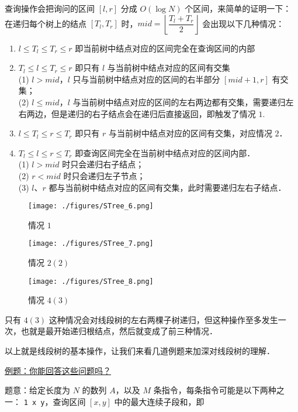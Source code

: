 查询操作会把询问的区间 $[l, r]$ 分成 $O(\log N)$ 个区间，来简单的证明一下：
在递归每个树上的结点 $[T_l, T_r]$ 时，$mid = \left\lfloor\dfrac{T_l+T_r}{2}\right\rfloor$ 会出现以下几种情况：

\begin{enumerate}
\item $l \leq T_l \leq T_r \leq r$ 即当前树中结点对应的区间完全在查询区间的内部
\item $T_l \leq l \leq T_r \leq r$ 即只有 $l$ 与当前树中结点对应的区间有交集\\
      (1) $l > mid$，$l$ 只与当前树中结点对应的区间的右半部分 $[mid + 1, r]$ 有交集； \\
      (2) $l \leq mid$，$l$ 与当前树中结点对应的区间的左右两边都有交集，需要递归左右两边，但是递归的右子结点会在递归后直接返回，即触发了情况 $1$.\\
\item $l \leq T_l \leq r \leq T_r$ 即只有 $r$ 与当前树中结点对应的区间有交集，对应情况 $2$．
\item $T_l \leq l \leq r \leq T_r$ 即查询区间完全在当前树中结点对应的区间内部．\\
      (1) $l > mid$ 时只会递归右子结点； \\
      (2) $r < mid$ 时只会递归左子节点； \\
      (3) $l$、$r$ 都与当前树中结点对应的区间有交集，此时需要递归左右子结点． \\

\end{enumerate}

\begin{figure}[ht]
\centering
\texttt{[image: ./figures/STree\_6.png]}
\caption{情况 $1$} \label{STree_fig6}
\end{figure}

\begin{figure}[ht]
\centering
\texttt{[image: ./figures/STree\_7.png]}
\caption{情况 $2(2)$} \label{STree_fig7}
\end{figure}

\begin{figure}[ht]
\centering
\texttt{[image: ./figures/STree\_8.png]}
\caption{情况 $4(3)$} \label{STree_fig8}
\end{figure}



只有 $4(3)$ 这种情况会对线段树的左右两棵子树递归，但这种操作至多发生一次，也就是最开始递归根结点，然后就变成了前三种情况．

以上就是线段树的基本操作，让我们来看几道例题来加深对线段树的理解．

\href{https://www.spoj.com/problems/GSS3/}{例题：你能回答这些问题吗？}

题意：给定长度为 $N$ 的数列 $A$，以及 $M$ 条指令，每条指令可能是以下两种之一：
 \verb|1 x y|，查询区间 $[x,y]$ 中的最大连续子段和，即 